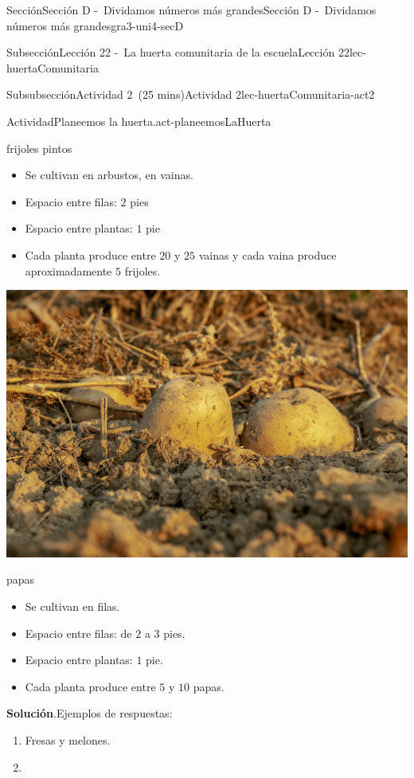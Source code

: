 \documentclass[oneside,10pt,]{article}
\newcommand{\blocktitlefont}{\relax}
\begin{document}
\begin{sectionptx}{Sección}{Sección D -~Dividamos números más grandes}{}{Sección D -~Dividamos números más grandes}{}{}{gra3-uni4-secD}
\begin{subsectionptx}{Subsección}{Lección 22 -~La huerta comunitaria de la escuela}{}{Lección 22}{}{}{lec-huertaComunitaria}
\begin{subsubsectionptx}{Subsubsección}{Actividad 2~(25 mins)}{}{Actividad 2}{}{}{lec-huertaComunitaria-act2}
\begin{activity}{Actividad}{Planeemos la huerta.}{act-planeemosLaHuerta}
\begin{sidebyside}{2}{0.025}{0.025}{0.05}
\begin{sbspanel}{0.45}
%
\par
frijoles pintos%
%
\begin{itemize}[label=\textbullet]
\item{}Se cultivan en arbustos, en vainas.%
\item{}Espacio entre filas: \(2\) pies%
\item{}Espacio entre plantas: \(1\) pie%
\item{}Cada planta produce entre \(20\) y \(25\) vainas y cada vaina produce aproximadamente \(5\) frijoles.%
\end{itemize}
\end{sbspanel}%
\begin{sbspanel}{0.45}%
\includegraphics[width=\linewidth]{external/jpg-source/3-4-D-22 Act2-papas.jpg}
%
\par
papas%
%
\begin{itemize}[label=\textbullet]
\item{}Se cultivan en filas.%
\item{}Espacio entre filas: de \(2\) a \(3\) pies.%
\item{}Espacio entre plantas: \(1\) pie.%
\item{}Cada planta produce entre \(5\) y \(10\) papas.%
\end{itemize}
\end{sbspanel}%
\end{sidebyside}%
\par\smallskip%
\noindent\textbf{\blocktitlefont Solución}.\hypertarget{act-planeemosLaHuerta-3}{}\quad{}Ejemplos de respuestas:%
%
\begin{enumerate}
\item{}Fresas y melones.%
\item{}%

\end{enumerate}
\end{activity}
\end{subsubsectionptx}
\end{subsectionptx}
\end{sectionptx}
\end{document}
